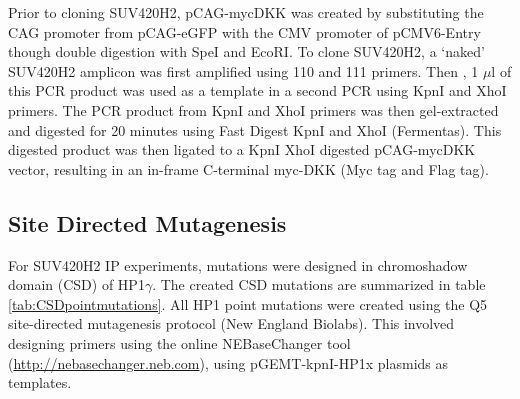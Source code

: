 \documentclass[onehalf,12pt]{beavtex}
\begin{document}
  Prior to cloning SUV420H2, pCAG-mycDKK was created by substituting the
  CAG promoter from pCAG-eGFP with the CMV promoter of pCMV6-Entry though
  double digestion with SpeI and EcoRI. To clone SUV420H2, a `naked'
  SUV420H2 amplicon was first amplified using 110 and 111 primers. Then ,
  1 \(\mu\)l of this PCR product was used as a template in a second PCR
  using KpnI and XhoI primers. The PCR product from KpnI and XhoI primers
  was then gel-extracted and digested for 20 minutes using Fast Digest
  KpnI and XhoI (Fermentas). This digested product was then ligated to a
  KpnI XhoI digested pCAG-mycDKK vector, resulting in an in-frame
  C-terminal myc-DKK (Myc tag and Flag tag).
  
  \FloatBarrier
  
  \subsection{Site Directed Mutagenesis}\label{site-directed-mutagenesis}
  
  For SUV420H2 IP experiments, mutations were designed in chromoshadow
  domain (CSD) of HP1\(\gamma\). The created CSD mutations are summarized
  in table \ref{tab:CSDpointmutations}. All HP1 point mutations were
  created using the Q5 site-directed mutagenesis protocol (New England
  Biolabs). This involved designing primers using the online NEBaseChanger
  tool (\url{http://nebasechanger.neb.com}), using pGEMT-kpnI-HP1x
  plasmids as templates.
  
  \begin{table}[t]
  
  \caption{\label{tab:CSDpointmutations}Chromoshadow Domain Mutations}
  \centering
  \end{table}
  
\end{document}
